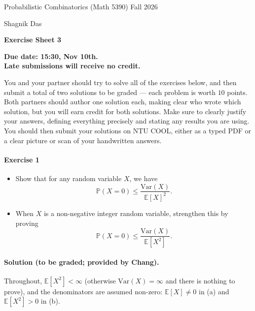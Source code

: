 \documentclass[a4paper,12pt]{article}
\newcommand{\courseTitle}{Probabilistic Combinatorics (Math 5390)}
\newcommand{\semester}{Fall 2026}
\newcommand{\instructorA}{Shagnik Das}
\newcommand{\instructorB}{}
\newcommand{\sheetNumber}{3}
\newcommand{\dueDate}{15:30, Nov 10th.}
\newcommand{\lateWarning}{Late submissions will receive no credit.}
\newcommand{\buildtitle}[4]{
\begin{flushleft}
{\large
#1
\hfill{}
#2
\par
#3
}
\end{flushleft}
\vskip 4pt
\begin{center}
{\large\bfseries#4\par}
\end{center}
\bigskip
}
\newcommand{\mb}[1]{\mathbb{#1}}
\begin{document}
\buildtitle{\courseTitle{}}{\semester}{\instructorA{} \hfill \instructorB{}}{Exercise Sheet \sheetNumber{}}

\vspace{-0.2in}

\begin{center}

{\bf Due date: \dueDate \\ \lateWarning}

\end{center}

\noindent You and your partner should try to solve all of the exercises below, and then submit a total of two solutions to be graded --- each problem is worth $10$ points. Both partners should author one solution each, making clear who wrote which solution, but you will earn credit for both solutions. Make sure to clearly justify your answers, defining everything precisely and stating any results you are using. You should then submit your solutions on NTU COOL, either as a typed PDF or a clear picture or scan of your handwritten answers.

\paragraph{Exercise 1}  
\begin{itemize}
	\item[(a)] Show that for any random variable $X$, we have
		\[ \mathbb{P}(X = 0) \le \frac{\mathrm{Var}(X)}{\mathbb{E}[X]^2}. \]
	\item[(b)] When $X$ is a non-negative integer random variable, strengthen this by proving
		\[ \mathbb{P}(X = 0) \le \frac{\mathrm{Var}(X)}{\mathbb{E}[X^2]}. \]
\end{itemize}

\paragraph{Solution (to be graded; provided by Chang).} Throughout, $\mb E[X^2] < \infty$ (otherwise $\mathrm{Var}(X) = \infty$ and there is nothing to prove), and the denominators are assumed non-zero: $\mb E[X] \neq 0$ in (a) and $\mb E[X^2] > 0$ in (b).
\end{document}
